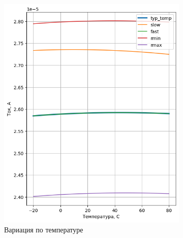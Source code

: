 \documentclass[a4paper,12pt]{article} %
\begin{document}
\begin{figure}[H]
    \begin{subfigure}[b]{0.5\textwidth}
      \includegraphics[width=\textwidth]{current_temp_thin.png}
      \caption{ Вариация по температуре }
      \label{pic:current_temp_thin}
    \end{subfigure}
    \begin{subfigure}[b]{0.5\textwidth}

\end{subfigure}
\end{figure}
\end{document}
